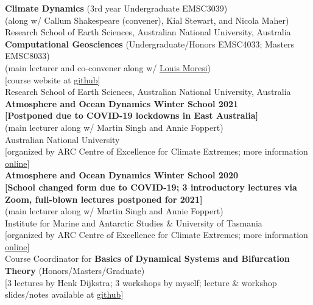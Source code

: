 \documentclass[10pt, letter]{article}
\newcommand{\years}[1]{\marginnote{\scriptsize #1}}
\begin{document}
\noindent\years{2024 -- }\textbf{Climate Dynamics} (3rd year Undergraduate EMSC3039)\\
(along w/ Callum Shakespeare (convener), Kial Stewart, and Nicola Maher)\\
Research School of Earth Sciences, Australian National University, Australia\\[.2cm]
\noindent\years{2021 -- 2023}\textbf{Computational Geosciences} (Undergraduate/Honors EMSC4033; Masters EMSC8033)\\
(main lecturer and co-convener along w/ \href{http://www.moresi.info}{\color{black}Louis Moresi})\\[0pt]
[course website at \href{https://github.com/ANU-RSES-Education/EMSC-4033}{github}]\\
Research School of Earth Sciences, Australian National University, Australia\\[.2cm]
\noindent\years{Jun.~2021}\textbf{Atmosphere and Ocean Dynamics Winter School 2021}\\
\textbf{[Postponed due to COVID-19 lockdowns in East Australia]}\\
(main lecturer along w/ Martin Singh and Annie Foppert)\\[0pt] 
Australian National University\\[0pt] 
[organized by ARC Centre of Excellence for Climate Extremes; more information \href{https://climateextremes.org.au/winter-school-2021-atmosphere-and-ocean-dynamics/}{online}]\\[.2cm]
\noindent\years{Jun.~2020}\textbf{Atmosphere and Ocean Dynamics Winter School 2020}\\
\textbf{[School changed form due to COVID-19; 3 introductory lectures via Zoom, full-blown lectures postponed for 2021]}\\
(main lecturer along w/ Martin Singh and Annie Foppert)\\[0pt] 
Institute for Marine and Antarctic Studies \& University of Tasmania\\[0pt] 
[organized by ARC Centre of Excellence for Climate Extremes; more information \href{https://climateextremes.org.au/clex-winter-school-2020-atmosphere-and-ocean-dynamics/}{online}]\\[.2cm]
\noindent\years{2020}Course Coordinator for \textbf{Basics of Dynamical Systems and Bifurcation Theory} (Honors/Masters/Graduate)\\[0pt] [3 lectures by Henk Dijkstra; 3 workshops by myself; lecture \& workshop slides/notes available at \href{https://github.com/ClimateFluidPhysics-ANU/DynamicalSystems-BifurcationTheory}{github}]\\
\end{document}
